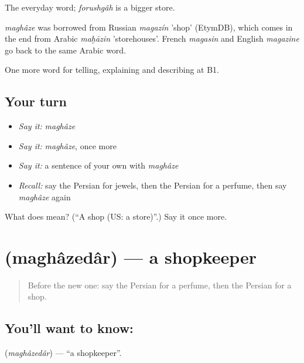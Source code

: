 The everyday word; \emph{forushgâh} is a bigger store.

\begin{cousinweb}
\emph{maghâze} was borrowed from Russian \emph{magazín} 'shop' (EtymDB), which comes in the end from Arabic \emph{maḫāzin} 'storehouses'. French \emph{magasin} and English \emph{magazine} go back to the same Arabic word.
\end{cousinweb}

\begin{grammarlens}[title={What you've built}]
One more word for telling, explaining and describing at B1.
\end{grammarlens}

\subsection*{Your turn}
\begin{itemize}
\raggedright
  \item \emph{Say it:} \emph{maghâze}
  \item \emph{Say it:} \emph{maghâze}, once more
  \item \emph{Say it:} a sentence of your own with \emph{maghâze}
  \item \emph{Recall:} say the Persian for jewels, then the Persian for a perfume, then say \emph{maghâze} again
\end{itemize}

\begin{tcolorbox}[breakable,colback=teal!4,colframe=teal!35!black,title={Before you move on}]
What does  mean? (\textquotedblleft{}A shop (US: a store)\textquotedblright{}.) Say it once more.
\end{tcolorbox}
\section[\texorpdfstring{\fa{مغازه} \fa{دار} (maghâzedâr)}{مغازه دار (maghâzedâr)}]{  (maghâzedâr) — a shopkeeper}

\label{lesson:FA-C464-maghazedar}



\begin{quote}
Before the new one: say the Persian for a perfume, then the Persian for a shop.
\end{quote}

\subsection*{You'll want to know:  }
\textbf{ } (\emph{maghâzedâr}) — \textquotedblleft{}a shopkeeper\textquotedblright{}.

